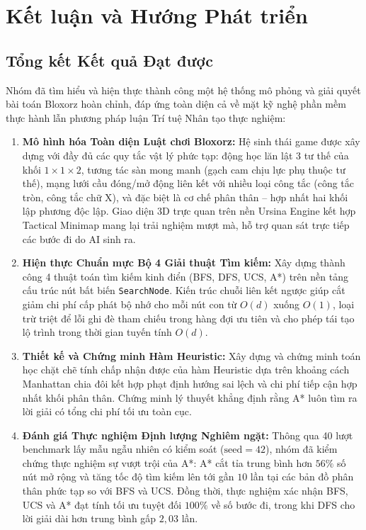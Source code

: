\section{Kết luận và Hướng Phát triển}
\label{sec:conclusion}

\subsection{Tổng kết Kết quả Đạt được}
Nhóm đã tìm hiểu và hiện thực thành công một hệ thống mô phỏng và
giải quyết bài toán Bloxorz hoàn chỉnh, đáp ứng toàn diện cả về mặt
kỹ nghệ phần mềm thực hành lẫn phương pháp luận Trí tuệ Nhân tạo thực nghiệm:

\begin{enumerate}[1.]
    \item \textbf{Mô hình hóa Toàn diện Luật chơi Bloxorz:}
    Hệ sinh thái game được xây dựng với đầy đủ các quy tắc vật lý phức tạp:
    động học lăn lật 3 tư thế của khối $1 \times 1 \times 2$, tương tác sàn
    mong manh (gạch cam chịu lực phụ thuộc tư thế), mạng lưới cầu đóng/mở động
    liên kết với nhiều loại công tắc (công tắc tròn, công tắc chữ X), và đặc
    biệt là cơ chế phân thân -- hợp nhất hai khối lập phương độc lập.
    Giao diện 3D trực quan trên nền Ursina Engine kết hợp Tactical Minimap
    mang lại trải nghiệm mượt mà, hỗ trợ quan sát trực tiếp các bước đi do AI
    sinh ra.

    \item \textbf{Hiện thực Chuẩn mực Bộ 4 Giải thuật Tìm kiếm:}
    Xây dựng thành công 4 thuật toán tìm kiếm kinh điển (BFS, DFS, UCS, A*)
    trên nền tảng cấu trúc nút bất biến \texttt{SearchNode}. Kiến trúc chuỗi
    liên kết ngược giúp cắt giảm chi phí cấp phát bộ nhớ cho mỗi nút con từ
    $O(d)$ xuống $O(1)$, loại trừ triệt để lỗi ghi đè tham chiếu trong hàng đợi
    ưu tiên và cho phép tái tạo lộ trình trong thời gian tuyến tính $O(d)$.

    \item \textbf{Thiết kế và Chứng minh Hàm Heuristic:}
    Xây dựng và chứng minh toán học chặt chẽ tính chấp nhận được của hàm
    Heuristic dựa trên khoảng cách Manhattan chia đôi kết hợp phạt định hướng
    sai lệch và chi phí tiếp cận hợp nhất khối phân thân. Chứng minh lý thuyết
    khẳng định rằng A* luôn tìm ra lời giải có tổng chi phí tối ưu toàn cục.

    \item \textbf{Đánh giá Thực nghiệm Định lượng Nghiêm ngặt:}
    Thông qua 40 lượt benchmark lấy mẫu ngẫu nhiên có kiểm soát
    ($\text{seed}=42$), nhóm đã kiểm chứng thực nghiệm sự vượt trội của A*:
    A* cắt tỉa trung bình hơn $56\%$ số nút mở rộng và tăng tốc độ tìm kiếm
    lên tới gần $10$ lần tại các bản đồ phân thân phức tạp so với BFS và UCS.
    Đồng thời, thực nghiệm xác nhận BFS, UCS và A* đạt tính tối ưu tuyệt đối
    $100\%$ về số bước đi, trong khi DFS cho lời giải dài hơn trung bình gấp
    $2,03$ lần.
\end{enumerate}

